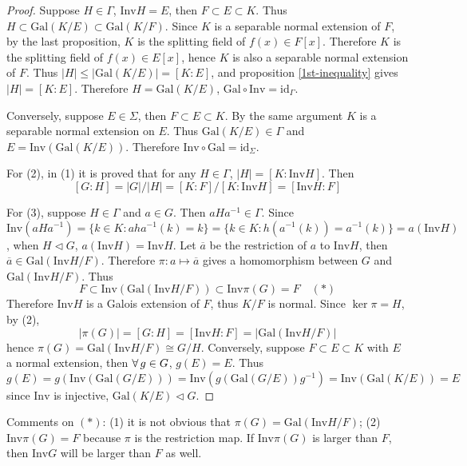 \begin{proof}
    Suppose $H\in\varGamma$, $\mathrm{Inv}H=E$, then $F\subset E\subset K$. Thus $H\subset\mathrm{Gal}(K/E)\subset\mathrm{Gal}(K/F)$. Since $K$ is a separable normal extension of $F$, by the last proposition, $K$ is the splitting field of $f(x)\in F[x]$. Therefore $K$ is the splitting field of $f(x)\in E[x]$, hence $K$ is also a separable normal extension of $F$. Thus $|H|\le|\mathrm{Gal}(K/E)|=[K:E]$, and proposition \ref{1st-inequality} gives $|H|=[K:E]$. Therefore $H=\mathrm{Gal}(K/E)$, $\mathrm{Gal}\circ\mathrm{Inv}=\mathrm{id}_{\varGamma}$.
    \par Conversely, suppose $E\in\varSigma$, then $F\subset E\subset K$. By the same argument $K$ is a separable normal extension on $E$. Thus $\mathrm{Gal}(K/E)\in\varGamma$ and $E=\mathrm{Inv}(\mathrm{Gal}(K/E))$. Therefore $\mathrm{Inv}\circ\mathrm{Gal}=\mathrm{id}_{\varSigma}$.
    \par For (2), in (1) it is proved that for any $H\in\varGamma$, $|H|=[K:\mathrm{Inv}H]$. Then
    $$
    [G:H]=|G|/|H|=[K:F]/[K:\mathrm{Inv}H]=[\mathrm{Inv}H:F]
    $$
    \par For (3), suppose $H\in\varGamma$ and $a\in G$. Then $aHa^{-1}\in\varGamma$. Since $\mathrm{Inv}(aHa^{-1})=\{k\in K:aha^{-1}(k)=k\}=\{k\in K:h(a^{-1}(k))=a^{-1}(k)\}=a(\mathrm{Inv}H)$, when $H\triangleleft G$, $a(\mathrm{Inv}H)=\mathrm{Inv}H$. Let $\overline{a}$ be the restriction of $a$ to $\mathrm{Inv}H$, then $\overline{a}\in\mathrm{Gal}(\mathrm{Inv}H/F)$. Therefore $\pi:a\mapsto\overline{a}$ gives a homomorphism between $G$ and $\mathrm{Gal}(\mathrm{Inv}H/F)$. Thus
    $$
    F\subset\mathrm{Inv}(\mathrm{Gal}(\mathrm{Inv}H/F))\subset\mathrm{Inv}\pi(G)=F\quad (*)
    $$
    Therefore $\mathrm{Inv}H$ is a Galois extension of $F$, thus $K/F$ is normal. Since $\ker\pi=H$, by (2),
    $$
    |\pi(G)|=[G:H]=[\mathrm{Inv}H:F]=|\mathrm{Gal}(\mathrm{Inv}H/F)|
    $$
    hence $\pi(G)=\mathrm{Gal}(\mathrm{Inv}H/F)\cong G/H$. Conversely, suppose $F\subset E\subset K$ with $E$ a normal extension, then $\forall\, g\in G$, $g(E)=E$. Thus
    $$
    g(E)=g(\mathrm{Inv}(\mathrm{Gal}(G/E)))=\mathrm{Inv}(g(\mathrm{Gal}(G/E))g^{-1})=\mathrm{Inv}(\mathrm{Gal}(K/E))=E
    $$
    since $\mathrm{Inv}$ is injective, $\mathrm{Gal}(K/E)\triangleleft G$.
\end{proof}
\begin{remark}
    Comments on $(*)$: (1) it is not obvious that $\pi(G)=\mathrm{Gal}(\mathrm{Inv}H/F)$; (2) $\mathrm{Inv}\pi(G)=F$ because $\pi$ is the restriction map. If $\mathrm{Inv}\pi(G)$ is larger than $F$, then $\mathrm{Inv}G$ will be larger than $F$ as well.
\end{remark}